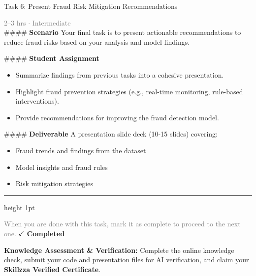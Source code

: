 \documentclass[10pt,a4paper]{article}
\begin{document}
\begin{taskbox}{Task 6: Present Fraud Risk Mitigation Recommendations}

    {\small \textcolor{gray}{2--3 hrs $\cdot$ Intermediate}}\\[12pt]

    \#\#\#\# \textbf{Scenario}  
Your final task is to present actionable recommendations to reduce fraud risks based on your analysis and model findings.  

\#\#\#\# \textbf{Student Assignment}  
\begin{itemize}
    \item Summarize findings from previous tasks into a cohesive presentation.  
    \item Highlight fraud prevention strategies (e.g., real-time monitoring, rule-based interventions).  
    \item Provide recommendations for improving the fraud detection model.  
\end{itemize}

\#\#\#\# \textbf{Deliverable}  
A presentation slide deck (10-15 slides) covering:  
\begin{itemize}
    \item Fraud trends and findings from the dataset  
    \item Model insights and fraud rules  
    \item Risk mitigation strategies\par
\end{itemize}

    \vspace{16pt}

    \textcolor{cardBorder}{\hrule height 1pt}\vspace{8pt}

    \small \textcolor{gray}{When you are done with this task, mark it as complete to proceed to the next one.} \hfill \textbf{\textcolor{brandDark}{$\checkmark$ Completed}}

\end{taskbox}

\begin{completionbox}
    \textbf{Knowledge Assessment \& Verification:} Complete the online knowledge check, submit your code and presentation files for AI verification, and claim your \textbf{Skillzza Verified Certificate}.
\end{completionbox}

\newpage

\end{document}
